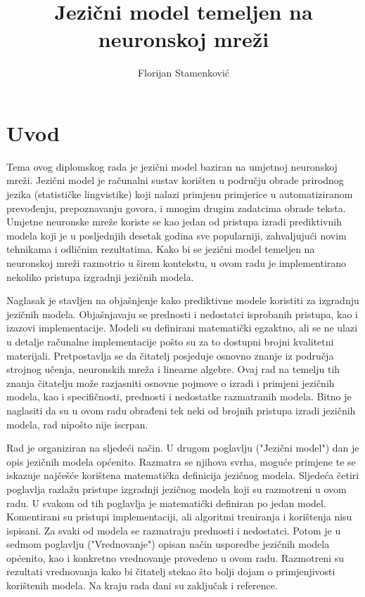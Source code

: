 \documentclass[times, utf8, diplomski, numeric]{fer}
\begin{document}
\title{Jezični model temeljen na neuronskoj mreži}

\author{Florijan Stamenković}

\maketitle

\tableofcontents

\chapter{Uvod}

Tema ovog diplomskog rada je jezični model baziran na umjetnoj neuronskoj mreži. Jezični model je računalni sustav korišten u području obrade prirodnog jezika (statističke lingvistike) koji nalazi primjenu primjerice u automatiziranom prevođenju, prepoznavanju govora, i mnogim drugim zadatcima obrade teksta. Umjetne neuronske mreže koriste se kao jedan od pristupa izradi prediktivnih modela koji je u posljednjih desetak godina sve popularniji, zahvaljujući novim tehnikama i odličnim rezultatima. Kako bi se jezični model temeljen na neuronskoj mreži razmotrio u širem kontekstu, u ovom radu je implementirano nekoliko pristupa izgradnji jezičnih modela.

Naglasak je stavljen na objašnjenje kako prediktivne modele koristiti za izgradnju jezičnih modela. Objašnjavaju se prednosti i nedostatci isprobanih pristupa, kao i izazovi implementacije. Modeli su definirani matematički egzaktno, ali se ne ulazi u detalje računalne implementacije pošto su za to dostupni brojni kvalitetni materijali. Pretpostavlja se da čitatelj posjeduje osnovno znanje iz područja strojnog učenja, neuronskih mreža i linearne algebre. Ovaj rad na temelju tih znanja čitatelju može razjasniti osnovne pojmove o izradi i primjeni jezičnih modela, kao i specifičnosti, prednosti i nedostatke razmatranih modela. Bitno je naglasiti da su u ovom radu obrađeni tek neki od brojnih pristupa izradi jezičnih modela, rad nipošto nije iscrpan.

Rad je organiziran na sljedeći način. U drugom poglavlju ("Jezični model") dan je opis jezičnih modela općenito. Razmatra se njihova svrha, moguće primjene te se iskazuje najčešće korištena matematička definicija jezičnog modela. Sljedeća četiri poglavlja razlažu pristupe izgradnji jezičnog modela koji su razmotreni u ovom radu. U svakom od tih poglavlja je matematički definiran po jedan model. Komentirani su pristupi implementaciji, ali algoritmi treniranja i korištenja nisu ispisani. Za svaki od modela se razmatraju prednosti i nedostatci. Potom je u sedmom poglavlju ("Vrednovanje") opisan način usporedbe jezičnih modela općenito, kao i konkretno vrednovanje provedeno u ovom radu. Razmotreni su rezultati vrednovanja kako bi čitatelj stekao što bolji dojam o primjenjivosti korištenih modela. Na kraju rada dani su zaključak i reference.
\end{document}
